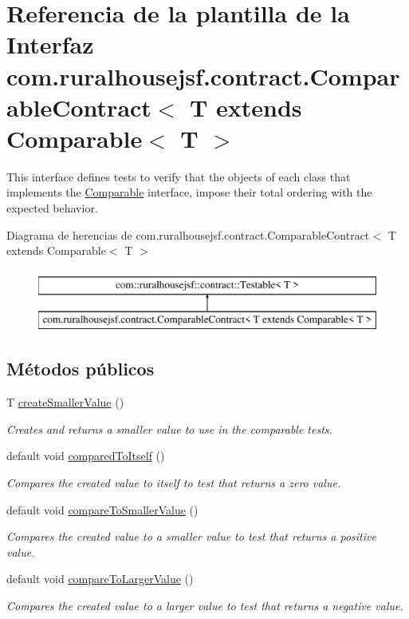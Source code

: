\hypertarget{a00236}{}\section{Referencia de la plantilla de la Interfaz com.\+ruralhousejsf.\+contract.\+Comparable\+Contract$<$ T extends Comparable$<$ T $>$}
\label{a00236}


This interface defines tests to verify that the objects of each class that implements the \mbox{\hyperlink{}{Comparable}} interface, impose their total ordering with the expected behavior.  


Diagrama de herencias de com.\+ruralhousejsf.\+contract.\+Comparable\+Contract$<$ T extends Comparable$<$ T $>$\begin{figure}[H]
\begin{center}
\leavevmode
\includegraphics[height=2.000000cm]{a00236}
\end{center}
\end{figure}
\subsection*{Métodos públicos}
\begin{DoxyCompactItemize}
\item 
T \mbox{\hyperlink{a00236_a63e1e8c46f202f132c7f15b51a11ee27}{create\+Smaller\+Value}} ()
\begin{DoxyCompactList}\small\item\em Creates and returns a smaller value to use in the comparable tests. \end{DoxyCompactList}\item 
default void \mbox{\hyperlink{a00236_ad21966d20e5fffd0fa13cd021c262f11}{compared\+To\+Itself}} ()
\begin{DoxyCompactList}\small\item\em Compares the created value to itself to test that returns a zero value. \end{DoxyCompactList}\item 
default void \mbox{\hyperlink{a00236_aa5df8ced74d7707d219de7d79eb04cb1}{compare\+To\+Smaller\+Value}} ()
\begin{DoxyCompactList}\small\item\em Compares the created value to a smaller value to test that returns a positive value. \end{DoxyCompactList}\item 
default void \mbox{\hyperlink{a00236_aceb2f65e9d26e521c6dc0eb2cbe6a35d}{compare\+To\+Larger\+Value}} ()
\begin{DoxyCompactList}\small\item\em Compares the created value to a larger value to test that returns a negative value. \end{DoxyCompactList}\end{DoxyCompactItemize}


